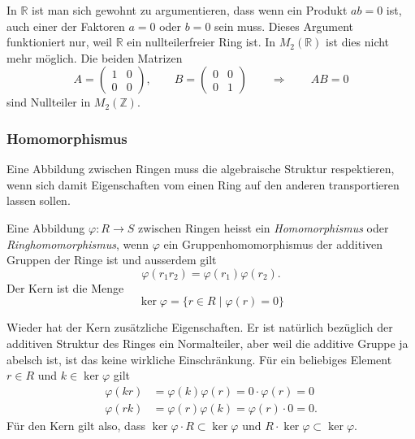 In $\mathbb{R}$ ist man sich gewohnt zu argumentieren, dass wenn ein
Produkt $ab=0$ ist, auch einer der Faktoren $a=0$ oder $b=0$ sein muss.
Dieses Argument funktioniert nur, weil $\mathbb{R}$ ein nullteilerfreier
Ring ist.
In $M_2(\mathbb{R})$ ist dies nicht mehr möglich.
Die beiden Matrizen
\[
A=\begin{pmatrix}
1&0\\0&0
\end{pmatrix}
,\qquad
B=\begin{pmatrix}
0&0\\0&1
\end{pmatrix}
\qquad\Rightarrow\qquad
AB=0
\]
sind Nullteiler in $M_2(\mathbb{Z})$.

\subsubsection{Homomorphismus}
Eine Abbildung zwischen Ringen muss die algebraische Struktur respektieren,
wenn sich damit Eigenschaften vom einen Ring auf den anderen transportieren
lassen sollen.

\begin{definition}
Eine Abbildung $\varphi:R \to S$ zwischen Ringen heisst ein
{\em Homomorphismus}
%
oder {\em Ringhomomorphismus},
%
wenn $\varphi$ ein Gruppenhomomorphismus der additiven Gruppen der Ringe
ist und ausserdem gilt
\[
\varphi(r_1r_2) = \varphi(r_1)\varphi(r_2).
\]
Der Kern ist die Menge
\[
\ker\varphi = \{ r\in R\;|\; \varphi(r)=0\}
\]
%
\end{definition}

Wieder hat der Kern zusätzliche Eigenschaften.
Er ist natürlich bezüglich der additiven Struktur des Ringes ein
Normalteiler, aber weil die additive Gruppe ja abelsch ist, ist das
keine wirkliche Einschränkung.
Für ein beliebiges Element $r\in R$ und $k\in \ker\varphi$ gilt
\begin{align*}
\varphi(kr) &= \varphi(k)\varphi(r) = 0\cdot\varphi(r) = 0
\\
\varphi(rk) &= \varphi(r)\varphi(k) = \varphi(r)\cdot 0 = 0.
\end{align*}
Für den Kern gilt also, dass $\ker\varphi\cdot R\subset \ker\varphi$
und $R\cdot\ker\varphi\subset\ker\varphi$.

